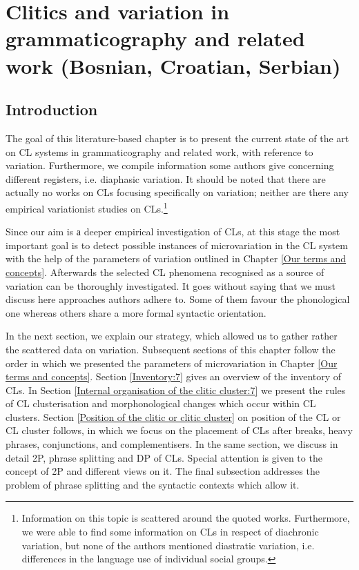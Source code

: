 \chapter[Clitics and variation in grammaticography and related work]
        {Clitics and variation in grammaticography and related work (Bosnian, Croatian, Serbian)}
\label{Clitics and variation in grammaticography and related work}
\section{Introduction}

The goal of this literature-based chapter is to present the current state of the art on CL systems in grammaticography and related work, with reference to variation. Furthermore, we compile information some authors give concerning different registers, i.e. diaphasic variation. It should be noted that there are actually no works on CLs focusing specifically on variation; neither are there any empirical variationist studies on CLs.\footnote{Information on this topic is scattered around the quoted works. Furthermore, we were able to find some information on CLs in respect of diachronic variation, but none of the authors mentioned diastratic variation, i.e. differences in the language use of individual social groups. }

Since our aim is а deeper empirical investigation of CLs, at this stage the most important goal is to detect possible instances of microvariation in the CL system with the help of the parameters of variation outlined in Chapter \ref{Our terms and concepts}. Afterwards the selected CL phenomena recognised as a source of variation can be thoroughly investigated. It goes without saying that we must discuss here approaches authors adhere to. Some of them favour the phonological one whereas others share a more formal syntactic orientation.

In the next section, we explain our strategy, which allowed us to gather rather the scattered data on variation. Subsequent sections of this chapter follow the order in which we presented the parameters of microvariation in Chapter \ref{Our terms and concepts}. Section \ref{Inventory:7} gives an overview of the inventory of CLs. In Section \ref{Internal organisation of the clitic cluster:7} we present the rules of CL clusterisation and morphonological changes which occur within CL clusters. Section \ref{Position of the clitic or clitic cluster} on position of the CL or CL cluster follows, in which we focus on the placement of CLs after breaks, heavy phrases, conjunctions, and complementisers. In the same section, we discuss in detail 2P, phrase splitting and DP of CLs. Special attention is given to the concept of 2P and different views on it. The final subsection addresses the problem of phrase splitting and the syntactic contexts which allow it. 

